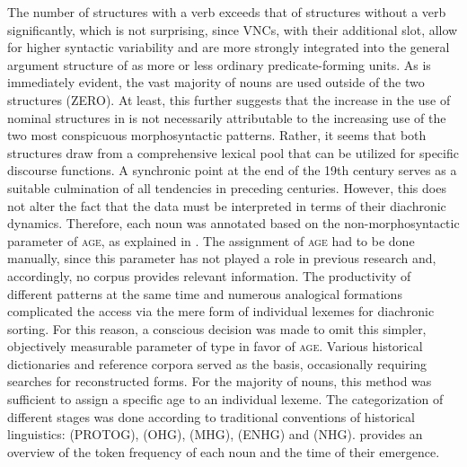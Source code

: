 \documentclass[output=paper,colorlinks,citecolor=brown]{langscibook}
\begin{document}
The number of structures with a verb exceeds that of structures without a verb significantly, which is not surprising, since VNCs, with their additional slot, allow for higher syntactic variability and are more strongly integrated into the general argument structure of  as more or less ordinary predicate-forming units. As is immediately evident, the vast majority of nouns are used outside of the two structures (ZERO). At least, this further suggests that the increase in the use of nominal structures in  is not necessarily attributable to the increasing use of the two most conspicuous morphosyntactic patterns. Rather, it seems that both structures draw from a comprehensive lexical pool that can be utilized for specific discourse functions. A synchronic point at the end of the 19th century serves as a suitable culmination of all tendencies in preceding centuries. However, this does not alter the fact that the data must be interpreted in terms of their diachronic dynamics. Therefore, each noun was annotated based on the non-morphosyntactic parameter of \textsc{age}, as explained in . The assignment of \textsc{age} had to be done manually, since this parameter has not played a role in previous research and, accordingly, no corpus provides relevant information. The productivity of different  patterns at the same time and numerous analogical formations complicated the access via the mere form of individual lexemes for diachronic sorting. For this reason, a conscious decision was made to omit this simpler, objectively measurable parameter of  type in favor of \textsc{age}. Various historical dictionaries and reference corpora served as the basis, occasionally requiring searches for reconstructed forms. For the majority of nouns, this method was sufficient to assign a specific age to an individual lexeme. The categorization of different stages was done according to traditional conventions of historical linguistics:  (PROTOG),  (OHG),  (MHG),  (ENHG) and  (NHG).  provides an overview of the token frequency of each noun and the time of their emergence.
\end{document}
